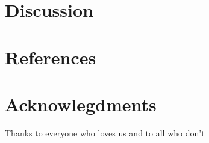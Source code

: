 \documentclass[12pt,review,authoryear]{elsarticle}
\begin{document}

\section{Discussion}




\section*{References}

	 
	



\section*{Acknowlegdments}
	Thanks to everyone who loves us and to all who don't



\end{document}
